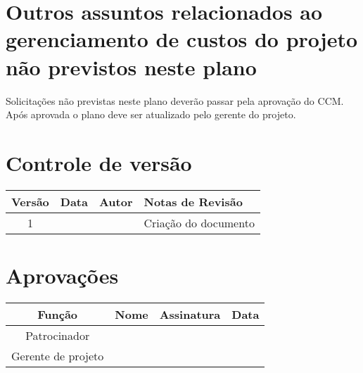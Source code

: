\section{Outros assuntos relacionados ao gerenciamento de custos do projeto não previstos neste plano}

Solicitações não previstas neste plano deverão passar pela aprovação do CCM. Após aprovada o plano deve ser atualizado pelo gerente do projeto.

\section{Controle de versão}

\begin{table}[H]
	\begin{tabularx}{\textwidth}{| c | c | X | X |}
		\hline
		\textbf{Versão} & \textbf{Data} & \textbf{Autor}        & \textbf{Notas de Revisão} \\
		\hline
		1                &               & \projectManagerName{} & Criação do documento     \\
		\hline
	\end{tabularx}
	\centering
\end{table}

\section{Aprovações}

\begin{table}[H]
	\begin{tabularx}{\textwidth}{| c | c | X | c |}
		\hline
		\textbf{Função}  & \textbf{Nome}         & \textbf{Assinatura}        & \textbf{Data} \\
		\hline
		Patrocinador       & \projectSponsorName{} & \projectSponsorSignature{} &               \\
		\hline
		Gerente de projeto & \projectManagerName{} & \projectManagerSignature{} &               \\
		\hline
	\end{tabularx}
	\centering
\end{table}